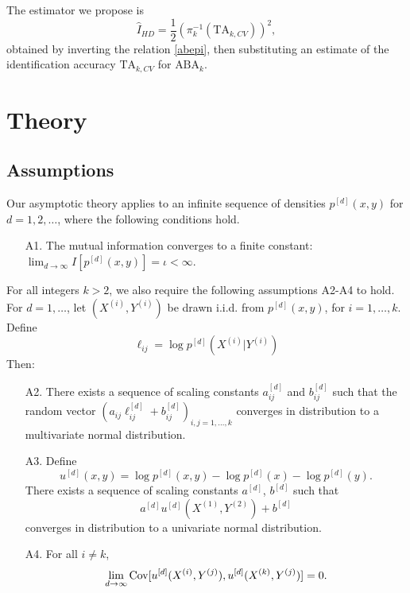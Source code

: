 The estimator we propose is
\begin{equation}\label{eq:hat_i_hd}
\hat{I}_{HD} = \frac{1}{2}(\pi_{k}^{-1}(\text{TA}_{k,CV}))^2,
\end{equation}
obtained by inverting the relation \eqref{abepi}, then substituting
an estimate of the identification accuracy $\text{TA}_{k, CV}$ for $\text{ABA}_k$.  

\section{Theory}

\subsection{Assumptions}\label{sec:ch5_assumptions}

Our asymptotic theory applies to an infinite sequence of densities
$p^{[d]}(x, y)$ for $d = 1,2,\hdots$, where the following conditions hold.

\begin{itemize}
\item[A1.] The mutual information converges to a finite constant: $\lim_{d \to \infty} I[p^{[d]}(x, y)] = \iota < \infty.$
\end{itemize}
For all integers $k > 2$, we also require the following assumptions A2-A4 to
hold.  For $d = 1,\hdots$, let $(X^{(i)}, Y^{(i)})$ be drawn
i.i.d. from $p^{[d]}(x, y)$, for $i = 1,\hdots, k$.  
Define \[\ell_{ij} = \log p^{[d]}(X^{(i)}|Y^{(i)})\]
Then:
\begin{itemize}
\item[A2.] There exists a sequence of scaling constants $a_{ij}^{[d]}$
and $b_{ij}^{[d]}$ such that the random vector $(a_{ij}\ell_{ij}^{[d]} +
b_{ij}^{[d]})_{i, j = 1,\hdots, k}$ converges in distribution to a
multivariate normal distribution.
\item[A3.] Define \[
u^{[d]}(x, y) = \log p^{[d]}(x, y) - \log p^{[d]}(x) - \log p^{[d]}(y).
\]
There exists a sequence of scaling constants $a^{[d]}$, $b^{[d]}$ such that
\[
a^{[d]}u^{[d]}(X^{(1)}, Y^{(2)}) + b^{[d]}
\]
converges in distribution to a univariate normal distribution.
\item[A4.] For all $i \neq k$,
\[\lim_{d \to \infty}\text{Cov}[u^{[d]}(X^{(i)}, Y^{(j)}), u^{[d]}(X^{(k)}, Y^{(j)})] = 0.\]
\end{itemize}

